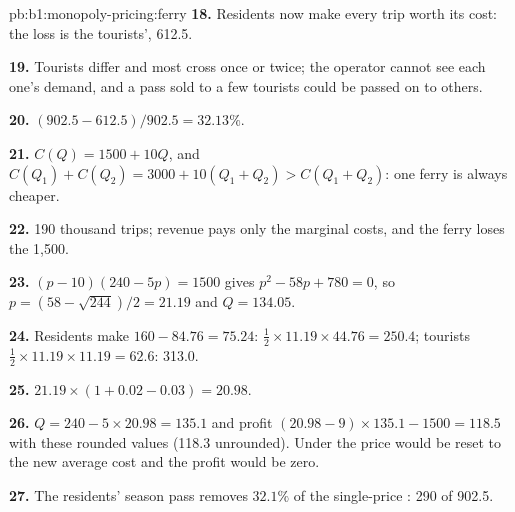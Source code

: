 \begin{solution}{pb:b1:monopoly-pricing:ferry}
\textbf{18.} Residents now make every trip worth its cost: the loss is the
tourists', 612.5.

\textbf{19.} Tourists differ and most cross once or twice; the operator
cannot see each one's demand, and a pass sold to a few tourists could be
passed on to others.

\textbf{20.} $(902.5 - 612.5)/902.5 = 32.13\%$.

\textbf{21.} $C(Q) = 1500 + 10Q$, and
$C(Q_1) + C(Q_2) = 3000 + 10(Q_1 + Q_2) > C(Q_1 + Q_2)$: one ferry is always cheaper.

\textbf{22.} 190 thousand trips; revenue pays only the marginal costs, and the
ferry loses the 1,500.

\textbf{23.} $(p - 10)(240 - 5p) = 1500$ gives $p^2 - 58p + 780 = 0$, so
$p = (58 - \sqrt{244})/2 = 21.19$ and $Q = 134.05$.

\textbf{24.} Residents make $160 - 84.76 = 75.24$: $\tfrac12 \times 11.19 \times 44.76 = 250.4$; tourists
$\tfrac12 \times 11.19 \times 11.19 = 62.6$: 313.0.

\textbf{25.} $21.19 \times (1 + 0.02 - 0.03) = 20.98$.

\textbf{26.} $Q = 240 - 5 \times 20.98 = 135.1$ and profit $(20.98 - 9) \times 135.1 - 1500 = 118.5$ with
these rounded values (118.3 unrounded). Under  the price
would be reset to the new average cost and the profit would be zero.

\textbf{27.} The residents' season pass removes $32.1\%$ of the single-price
: 290 of 902.5.
\end{solution}
